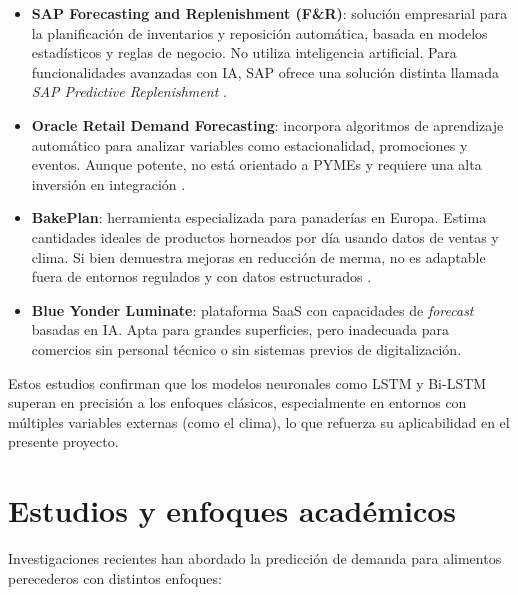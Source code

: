 \begin{itemize}
    \item \textbf{SAP Forecasting and Replenishment (F\&R)}: solución empresarial para la planificación de inventarios y reposición automática, basada en modelos estadísticos y reglas de negocio. No utiliza inteligencia artificial. Para funcionalidades avanzadas con IA, SAP ofrece una solución distinta llamada \textit{SAP Predictive Replenishment} \parencite{sap2025}.
    
    \item \textbf{Oracle Retail Demand Forecasting}: incorpora algoritmos de aprendizaje automático para analizar variables como estacionalidad, promociones y eventos. Aunque potente, no está orientado a PYMEs y requiere una alta inversión en integración \parencite{oracle2021}.
    
    \item \textbf{BakePlan}: herramienta especializada para panaderías en Europa. Estima cantidades ideales de productos horneados por día usando datos de ventas y clima. Si bien demuestra mejoras en reducción de merma, no es adaptable fuera de entornos regulados y con datos estructurados \parencite{netherlands2019}.
    
    \item \textbf{Blue Yonder Luminate}: plataforma SaaS con capacidades de \textit{forecast} basadas en IA. Apta para grandes superficies, pero inadecuada para comercios sin personal técnico o sin sistemas previos de digitalización.
\end{itemize}

Estos estudios confirman que los modelos neuronales como LSTM y Bi-LSTM superan en precisión a los enfoques clásicos, especialmente en entornos con múltiples variables externas (como el clima), lo que refuerza su aplicabilidad en el presente proyecto.

\section{Estudios y enfoques académicos}

Investigaciones recientes han abordado la predicción de demanda para alimentos perecederos con distintos enfoques:

